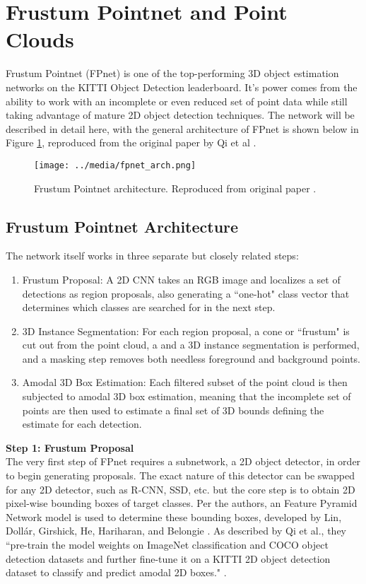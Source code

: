 \newpage
\section{Frustum Pointnet and Point Clouds} %
\label{sect_fpnet}

Frustum Pointnet (FPnet) is one of the top-performing 3D object estimation networks on the KITTI Object Detection leaderboard. It's power comes from the ability to work with an incomplete or even reduced set of point data while still taking advantage of mature 2D object detection techniques. The network will be described in detail here, with the general architecture of FPnet is shown below in Figure \ref{fpnet_arch}, reproduced from the original paper by Qi et al \cite{qi_frustum_2017}. 

\begin{figure}[H]
    \centering
    \texttt{[image: ../media/fpnet\_arch.png]}
    \caption{Frustum Pointnet architecture. Reproduced from original paper \cite{qi_frustum_2017}.}
    \label{fpnet_arch}
\end{figure}

\subsection{Frustum Pointnet Architecture}
The network itself works in three separate but closely related steps: 
\begin{enumerate}
    \item Frustum Proposal: A 2D CNN takes an RGB image and localizes a set of detections as region proposals, also generating a ``one-hot" class vector that determines which classes are searched for in the next step.
    \item 3D Instance Segmentation: For each region proposal, a cone or ``frustum" is cut out from the point cloud, a and a 3D instance segmentation is performed, and a masking step removes both needless foreground and background points.
    \item Amodal 3D Box Estimation: Each filtered subset of the point cloud is then subjected to amodal 3D box estimation, meaning that the incomplete set of points are then used to estimate a final set of 3D bounds defining the estimate for each detection.
\end{enumerate}

\textbf{{\large Step 1: Frustum Proposal}} \\
The very first step of FPnet requires a subnetwork, a 2D object detector, in order to begin generating proposals. The exact nature of this detector can be swapped for any 2D detector, such as R-CNN, SSD, etc. but the core step is to obtain 2D pixel-wise bounding boxes of target classes. Per the authors, an Feature Pyramid Network model is used to determine these bounding boxes, developed by Lin, Dollár, Girshick, He, Hariharan, and Belongie \cite{lin_feature_2017}. As described by Qi et al., they ``pre-train the model weights on ImageNet classification and COCO object detection datasets and further fine-tune it on a KITTI 2D object detection dataset to classify and predict amodal 2D boxes." \cite{qi_frustum_2017}.

